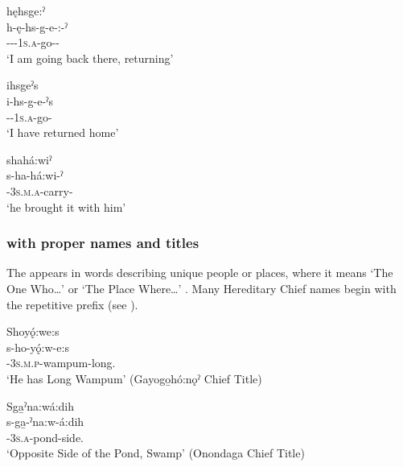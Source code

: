 \ex hęhsge:ˀ\\
\gll h-ę-hs-g-e-:-ˀ\\
{\translocative}-{\future}-{\repetitive}-\textsc{1s.a}-go-{\purposive}-{\punctual}\\
\glt `I am going back there, returning'

\ex ihsgeˀs\\
\gll i-hs-g-e-ˀs\\
{\prothetic}-{\repetitive}-\textsc{1s.a}-go-{\habitual}\\
\glt `I have returned home'

\ex shahá:wiˀ\\
\gll s-ha-há:wi-ˀ\\
{\repetitive}-\textsc{3s.m.a}-carry-{\punctual}\\
\glt `he brought it with him'
\z
\z

\largerpage
\subsubsection*{ {\repetitive} with proper names and titles} \label{[s-, j-, ji-] (repetitive) with proper names and titles}
The  {\repetitive} appears in words describing unique people or places, where it means ‘The One Who…’ or ‘The Place Where…’ . Many Hereditary Chief names begin with the repetitive prefix (see ).

\ea\label{ex:srepex3}

\ea Shoyǫ́:we:s\\
\gll s-ho-yǫ́:w-e:s\\
{\repetitive}-\textsc{3s.m.p}-wampum-long.{\stative}\\
\glt `He has Long Wampum' (Gayogo̱hó:nǫˀ Chief Title)

\ex Sga̱ˀna:wá:dih\\
\gll s-ga̱-ˀna:w-á:dih\\
{\repetitive}-\textsc{3s.a}-pond-side.{\stative}\\
\glt `Opposite Side of the Pond, Swamp' (Onondaga Chief Title)



